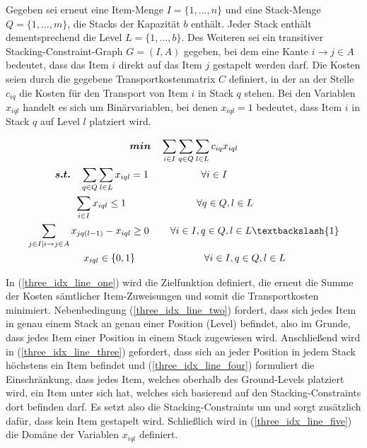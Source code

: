 Gegeben sei erneut eine Item-Menge $I = \{1, ..., n\}$ und eine Stack-Menge $Q = \{1, ..., m\}$, die Stacks der Kapazität $b$ enthält.
Jeder Stack enthält dementsprechend die Level $L = \{1, ..., b\}$. Des Weiteren sei ein transitiver Stacking-Constraint-Graph
$G = (I, A)$ gegeben, bei dem eine Kante $i \rightarrow j \in A$ bedeutet, dass das Item $i$ direkt auf das Item $j$ gestapelt werden darf.
Die Kosten seien durch die gegebene Transportkostenmatrix $C$ definiert, in der an der Stelle $c_{iq}$ die Kosten für den
Transport von Item $i$ in Stack $q$ stehen. Bei den Variablen $x_{iql}$ handelt es sich um Binärvariablen,
bei denen $x_{iql} = 1$ bedeutet, dass Item $i$ in Stack $q$ auf Level $l$ platziert wird.

\begin{gather}
\boldsymbol{min} \quad \sum_{i \in I} \sum_{q \in Q} \sum_{l \in L} c_{iq} x_{iql} \label{three_idx_line_one} \\
\boldsymbol{s.t.} \quad \sum_{q \in Q} \sum_{l \in L} x_{iql} = 1 \quad\thinspace\thinspace\quad\quad\quad\quad \forall i \in I \thinspace\thinspace\quad\quad\quad\quad\quad\quad\quad\quad\thinspace\thinspace \label{three_idx_line_two} \\
\sum_{i \in I} x_{iql} \leq 1 \thinspace\quad\quad\quad\quad\quad\quad\quad \forall q \in Q, l \in L \thinspace\thinspace\thinspace\thinspace\quad\quad\quad\thinspace \label{three_idx_line_three} \\
\sum_{j \in I | i \rightarrow j \in A} x_{jq(l-1)} - x_{iql} \geq 0 \thinspace\quad\quad \forall i \in I, q \in Q, l \in L \textbackslash \{1\}
\label{three_idx_line_four} \\
\quad\quad x_{iql} \in \{0, 1\} \quad\quad\quad\quad\quad\quad\quad \forall i \in I, q \in Q, l \in L \quad\thinspace\thinspace\thinspace\thinspace\thinspace \label{three_idx_line_five}
\end{gather}

In (\ref{three_idx_line_one}) wird die Zielfunktion definiert, die erneut die Summe der Kosten sämtlicher Item-Zuweisungen
und somit die Transportkosten minimiert.
Nebenbedingung (\ref{three_idx_line_two}) fordert, dass sich jedes Item in genau einem Stack an genau einer Position (Level) befindet,
also im Grunde, dass jedes Item einer Position in einem Stack zugewiesen wird.
Anschließend wird in (\ref{three_idx_line_three}) gefordert, dass sich an jeder Position in jedem Stack höchstens ein Item befindet und
(\ref{three_idx_line_four}) formuliert die Einschränkung, dass jedes Item, welches oberhalb des Ground-Levels platziert wird,
ein Item unter sich hat, welches sich basierend auf den Stacking-Constraints dort befinden darf.
Es setzt also die Stacking-Constraints um und sorgt zusätzlich dafür, dass kein Item  gestapelt wird.
Schließlich wird in (\ref{three_idx_line_five}) die Domäne der Variablen $x_{iql}$ definiert.

